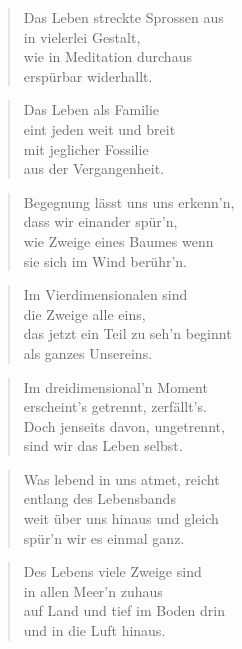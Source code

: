 \documentclass[10pt,a4paper]{article}
\begin{document}
\begin{multicols}{2}
\begin{verse}
Das Leben streckte Sprossen aus \\
in vielerlei Gestalt, \\
wie in Meditation durchaus \\
erspürbar widerhallt. \\
\end{verse}

\begin{verse}
Das Leben als Familie \\
eint jeden weit und breit \\
mit jeglicher Fossilie \\
aus der Vergangenheit. \\
\end{verse}

\begin{verse}
Begegnung lässt uns uns erkenn’n, \\
dass wir einander spür’n, \\
wie Zweige eines Baumes wenn \\
sie sich im Wind berühr’n. \\
\end{verse}

\begin{verse}
Im Vierdimensionalen sind \\
die Zweige alle eins, \\
das jetzt ein Teil zu seh’n beginnt \\
als ganzes Unsereins. \\
\end{verse}

\begin{verse}
Im dreidimensional’n Moment \\
erscheint’s getrennt, zerfällt’s. \\
Doch jenseits davon, ungetrennt, \\
sind wir das Leben selbst. \\
\end{verse}

\begin{verse}
Was lebend in uns atmet, reicht \\
entlang des Lebensbands \\
weit über uns hinaus und gleich \\
spür’n wir es einmal ganz. \\
\end{verse}

\begin{verse}
Des Lebens viele Zweige sind \\
in allen Meer’n zuhaus \\
auf Land und tief im Boden drin \\
und in die Luft hinaus. \\
\end{verse}


\end{multicols}
\end{document}
